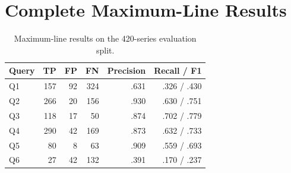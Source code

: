 \documentclass[11pt,a4paper]{article}
\begin{document}
\section{Complete Maximum-Line Results}

\begin{table}[H]
\centering
\small
\caption{Maximum-line results on the 420-series evaluation split.}
\begin{tabular}{lrrrrr}
\toprule
Query & TP & FP & FN & Precision & Recall / F1 \\
\midrule
Q1 & 157 & 92 & 324 & .631 & .326 / .430 \\
Q2 & 266 & 20 & 156 & .930 & .630 / .751 \\
Q3 & 118 & 17 & 50 & .874 & .702 / .779 \\
Q4 & 290 & 42 & 169 & .873 & .632 / .733 \\
Q5 & 80 & 8 & 63 & .909 & .559 / .693 \\
Q6 & 27 & 42 & 132 & .391 & .170 / .237 \\
\bottomrule
\end{tabular}
\end{table}
\end{document}
